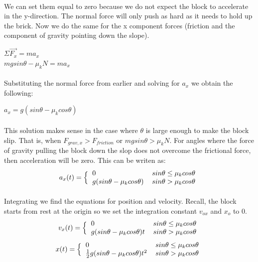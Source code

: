 \documentclass[11pt,a4paper]{report}
\begin{document}
\paragraph{}We can set them equal to zero because we do not expect the block to accelerate in the y-direction. The normal force will only push as hard as it needs to hold up the brick. Now we do the same for the x component forces (friction and the component of gravity pointing down the slope).
\begin{center}
$\Sigma{\vec{F_x}} = ma_x$\\
$mgsin\theta - \mu_kN = ma_x$
\end{center}
\paragraph{}Substituting the normal force from earlier and solving for $a_x$ we obtain the following:
\begin{center}
$a_x = g(sin\theta - \mu_kcos\theta)$
\end{center}
\paragraph{}This solution makes sense in the case where $\theta$ is large enough to make the block slip. That is, when $F_{grav, x} > F_{friction}$ or $mgsin\theta > \mu_kN$. For angles where the force of gravity pulling the block down the slop does not overcome the frictional force, then acceleration will be zero. This can be writen as: 
\[
 a_x(t) = 
 \Big \{
 \begin{tabular}{l l}
  $0$ & $ sin\theta \leq \mu_kcos\theta$ \\
  $g(sin\theta - \mu_kcos\theta) $ & $ sin\theta > \mu_kcos\theta$ 
 \end{tabular}
\]
\paragraph{}Integrating we find the equations for position and velocity. Recall, the block starts from rest at the origin so we set the integration constant $v_{ox}$ and $x_o$ to $0$.
\[
 v_x(t) = 
 \Big \{
 \begin{tabular}{l l}
  $0$ & $ sin\theta \leq \mu_kcos\theta$ \\
  $g(sin\theta - \mu_kcos\theta)t $ & $ sin\theta > \mu_kcos\theta$ \\
 \end{tabular}
\]
\[
 x(t) = 
 \Big \{
 \begin{tabular}{l l}
  $0$ & $ sin\theta \leq \mu_kcos\theta$ \\
  $\frac{1}{2}g(sin\theta - \mu_kcos\theta)t^2 $ & $ sin\theta > \mu_kcos\theta$ \\
 \end{tabular}
\]
\end{document}
